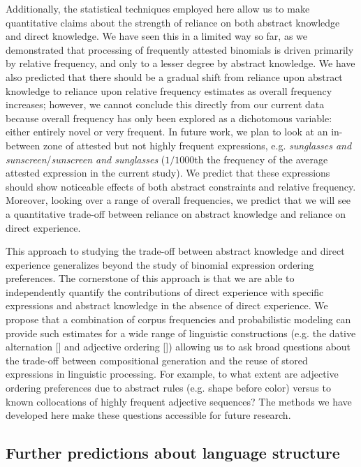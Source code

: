 \documentclass[authoryear]{elsarticle}
\begin{document}
Additionally, the statistical techniques employed here allow us to make quantitative claims about the strength of reliance on both abstract knowledge and direct knowledge. We have seen this in a limited way so far, as we demonstrated that processing of frequently attested binomials is driven primarily by relative frequency, and only to a lesser degree by abstract knowledge. We have also predicted that there should be a gradual shift from reliance upon abstract knowledge to reliance upon relative frequency estimates as overall frequency increases; however, we cannot conclude this directly from our current data because overall frequency has only been explored as a dichotomous variable: either entirely novel or very frequent. In future work, we plan to look at an in-between zone of attested but not highly frequent expressions, e.g. \emph{sunglasses and sunscreen}/\emph{sunscreen and sunglasses} ($1/1000$th the frequency of the average attested expression in the current study). We predict that these expressions should show noticeable effects of both abstract constraints and relative frequency. Moreover, looking over a range of overall frequencies, we predict that we will see a quantitative trade-off between reliance on abstract knowledge and reliance on direct experience. 

This approach to studying the trade-off between abstract knowledge and direct experience generalizes beyond the study of binomial expression ordering preferences. The cornerstone of this approach is that we are able to independently quantify the contributions of direct experience with specific expressions and abstract knowledge in the absence of direct experience. We propose that a combination of corpus frequencies and probabilistic modeling can provide such estimates for a wide range of linguistic constructions (e.g. the dative alternation [\citealp{Bresnan:2007td}] and adjective ordering [\citealp{Dixon:1982ur, Truswell:2009cr}]) allowing us to ask broad questions about the trade-off between compositional generation and the reuse of stored expressions in linguistic processing. For example, to what extent are adjective ordering preferences due to abstract rules (e.g. shape before color) versus to known collocations of highly frequent adjective sequences? The methods we have developed here make these questions accessible for future research.

\subsection{Further predictions about language structure}\label{future-work}
\end{document}
